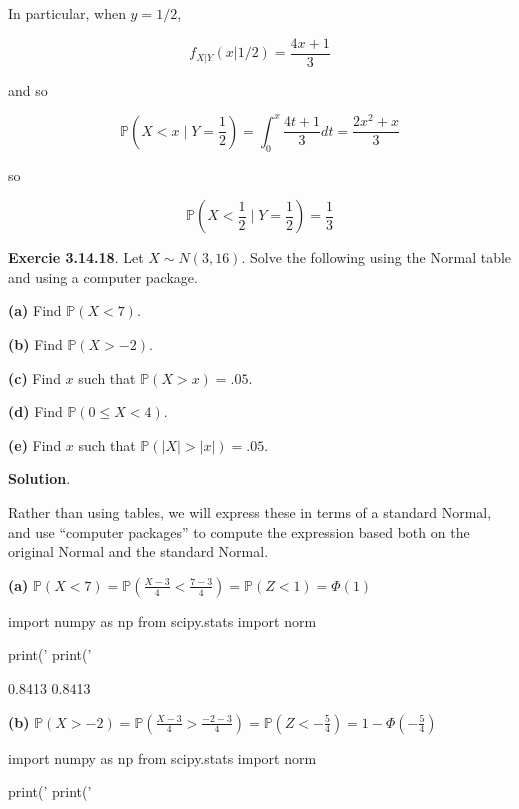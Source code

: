 In particular, when \(y = 1/2\),

\[f_{X|Y}(x | 1/2) = \frac{4x + 1}{3}\]

and so

\[ \mathbb{P}\left( X < x \;\Bigg|\; Y = \frac{1}{2} \right) = \int_{0}^x \frac{4t + 1}{3} dt = \frac{2x^{2} + x}{3} \]

so

\[ \mathbb{P}\left( X < \frac{1}{2} \;\Bigg|\; Y = \frac{1}{2} \right) = \frac{1}{3} \]

\textbf{Exercie 3.14.18}. Let \(X \sim N(3, 16)\). Solve the following
using the Normal table and using a computer package.

\textbf{(a)} Find \(\mathbb{P}(X < 7)\).

\textbf{(b)} Find \(\mathbb{P}(X > -2)\).

\textbf{(c)} Find \(x\) such that \(\mathbb{P}(X > x) = .05\).

\textbf{(d)} Find \(\mathbb{P}(0 \leq X < 4)\).

\textbf{(e)} Find \(x\) such that \(\mathbb{P}(|X| > |x|) = .05\).

\textbf{Solution}.

Rather than using tables, we will express these in terms of a standard
Normal, and use ``computer packages'' to compute the expression based
both on the original Normal and the standard Normal.

\textbf{(a)}
\(\mathbb{P}(X < 7) = \mathbb{P}\left(\frac{X - 3}{4} < \frac{7 - 3}{4} \right) = \mathbb{P}\left(Z < 1 \right) = \Phi\left( 1 \right)\)

\begin{python}
import numpy as np
from scipy.stats import norm

print('%
print('%
\end{python}

\begin{console}
0.8413
0.8413
\end{console}

\textbf{(b)} $\mathbb{P}(X > -2) =
\mathbb{P}\left(\frac{X - 3}{4} > \frac{-2 - 3}{4} \right)
= \mathbb{P}\left(Z < -\frac{5}{4} \right) = 1 - \Phi\left(
-\frac{5}{4} \right) $

\begin{python}
import numpy as np
from scipy.stats import norm

print('%
print('%
\end{python}

